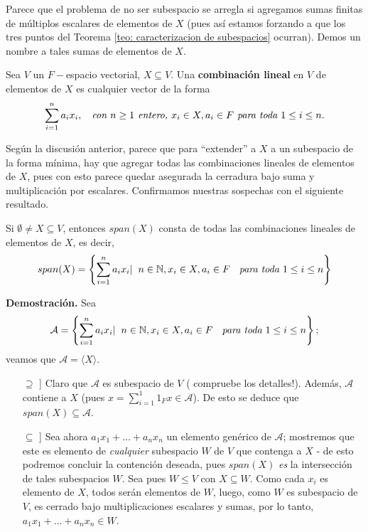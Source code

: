 Parece que el problema de no ser subespacio se arregla
si agregamos sumas finitas de múltiplos escalares de elementos
de $X$ (pues así estamos forzando a que los tres puntos del
Teorema \ref{teo: caracterizacion de subespacios}
ocurran). Demos un nombre a tales
sumas de elementos de $X$.

\begin{defi}
Sea $V$ un $F-$espacio vectorial, $X \subseteq V$. Una 
\textbf{combinación lineal} en $V$ de elementos de $X$ es cualquier
vector de la forma
\[
\sum_{i=1}^{n} a_{i}x_{i},
\hspace{0.2cm} \textit{ con }
n \geq 1 \textit{ entero, }
x_{i} \in X, a_{i} \in F
\textit{ para toda } 1 \leq i \leq n.
\] 
\end{defi}

Según la discusión anterior, parece que para ``extender''
a $X$ a un subespacio de la forma mínima, hay que agregar
todas las combinaciones lineales de elementos de $X$, pues con esto
parece quedar asegurada la cerradura bajo suma y multiplicación
por escalares. Confirmamos nuestras sospechas con el siguiente resultado.

\begin{prop}
	\label{prop: caract elementos del subesp generado por X}
Si $\emptyset \neq X \subseteq V$, entonces
$span (X)$ consta de todas las combinaciones lineales
de elementos de $X$, es decir,
\begin{equation}
	\label{eq: elementos del generado de X}
span (X) = \left\{ \sum_{i=1}^{n} a_{i}x_{i} | \hspace{0.2cm} 
n \in \mathbb{N}, x_{i} \in X, a_{i} \in F \hspace{0.2cm} \textit{ para toda }
1 \leq i \leq n \right\}
\end{equation}
\end{prop}
\noindent
\textbf{Demostración.}
Sea 
\[
\mathcal{A} = \left\{ \sum_{i=1}^{n} a_{i}x_{i} | \hspace{0.2cm} 
n \in \mathbb{N}, x_{i} \in X, a_{i} \in F \hspace{0.2cm} \textit{ para toda }
1 \leq i \leq n \right\};
\]
veamos que $\mathcal{A} = \langle X \rangle$.
\begin{itemize}
	\item[$\supseteq$]] Claro que $\mathcal{A}$ es subespacio de 
	$V$ ( compruebe los detalles!). Además, 
	$\mathcal{A}$ contiene a $X$ (pues $x = \sum_{i=1}^{1}1_{F} x \in \mathcal{A}$).
	De esto se deduce que $span ( X )\subseteq \mathcal{A}$.
	
	
	\item[$\subseteq$]] Sea ahora
	$a_{1} x_{1} + \ldots + a_{n} x_{n}$ un elemento genérico 
	de $\mathcal{A}$; mostremos que este es elemento de 
	\textit{cualquier} subespacio $W$ de $V$ que contenga a 
	$X$ - de esto podremos concluir la contención deseada, 
	pues $span ( X )$ \textit{es} la intersección 
	de tales subespacios $W$.
	Sea pues $W \leq V$ con $X \subseteq W$. Como cada
	$x_{i}$ es elemento de $X$, todos serán elementos de 
	$W$, luego, como $W$ es subespacio de $V$, es cerrado bajo 
	multiplicaciones escalares y sumas, por lo tanto,  
	$a_{1} x_{1} + \ldots + a_{n} x_{n} \in W$.
\end{itemize}

